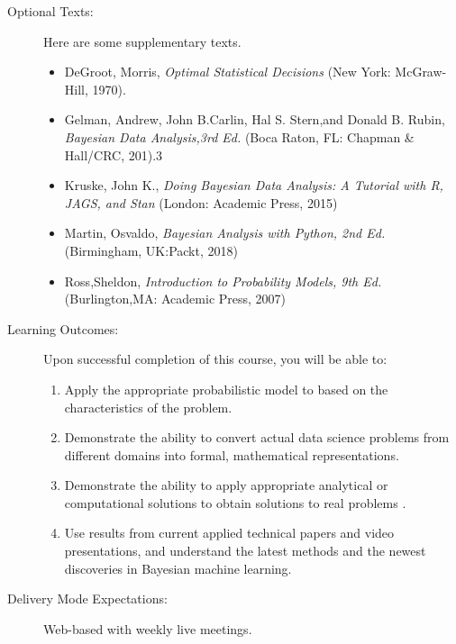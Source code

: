 \documentclass[11pt]{article}
\begin{document}
\begin{description}
\item[Optional Texts:]  

Here are some supplementary texts.

\begin{itemize}
\item DeGroot, Morris, \textit{Optimal Statistical Decisions} (New York: McGraw-Hill, 1970).
\item Gelman, Andrew, John B.Carlin, Hal S. Stern,and Donald B. Rubin, \textit{Bayesian Data Analysis,3rd
Ed.} (Boca Raton, FL: Chapman \& Hall/CRC, 201).3
\item Kruske, John K., \textit{Doing Bayesian Data Analysis: A Tutorial with R, JAGS, and Stan} (London:
Academic Press, 2015)
\item Martin, Osvaldo, \textit{Bayesian Analysis with Python, 2nd Ed.} (Birmingham, UK:Packt, 2018)
\item Ross,Sheldon, \textit{Introduction to Probability Models, 9th Ed.} (Burlington,MA: Academic Press,
2007)
\end{itemize}

\item[Learning Outcomes:]  

Upon successful completion of this course, you will be able to:

\begin{enumerate}
\item Apply the appropriate probabilistic model to based on the characteristics of the problem.
\item Demonstrate the ability to convert actual data science problems from different domains into formal, mathematical representations.
\item Demonstrate the ability to apply appropriate analytical or computational solutions to obtain solutions to real problems .
\item Use results from current applied technical papers and video presentations, and understand the latest methods and the newest discoveries in Bayesian machine learning.
\end{enumerate}


\item[Delivery Mode Expectations:]  

Web-based with weekly live meetings.


\end{description}
\end{document}
